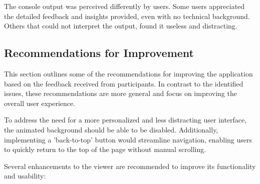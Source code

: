
The console output was perceived differently by users. 
Some users appreciated the detailed feedback and insights provided, even with no technical background. \cite{P5}
Others that could not interpret the output, found it useless and distracting. \cite{P3, P4}


\subsection*{Recommendations for Improvement}
\label{sec:results:recommendations}

This section outlines some of the recommendations for improving the application based on the feedback received from participants. 
In contrast to the identified issues, these recommendations are more general and focus on improving the overall user experience.

To address the need for a more personalized and less distracting user interface, the animated background should be able to be disabled.
Additionally, implementing a 'back-to-top' button would streamline navigation, enabling users to quickly return to the top of the page without manual scrolling. 
\cite{P10}

Several enhancements to the viewer are recommended to improve its functionality and usability:

